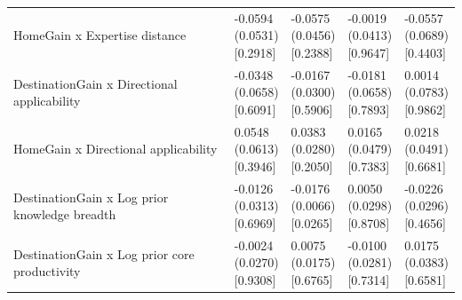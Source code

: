 \begin{tabular}{@{}>{\raggedright\arraybackslash}p{2.530in}>{\centering\arraybackslash}p{0.905in}>{\centering\arraybackslash}p{0.905in}>{\centering\arraybackslash}p{0.905in}>{\centering\arraybackslash}p{0.905in}@{}}
HomeGain x Expertise distance & \makecell[c]{-0.0594\\{}(0.0531)\\{}[0.2918]} & \makecell[c]{-0.0575\\{}(0.0456)\\{}[0.2388]} & \makecell[c]{-0.0019\\{}(0.0413)\\{}[0.9647]} & \makecell[c]{-0.0557\\{}(0.0689)\\{}[0.4403]} \\
DestinationGain x Directional applicability & \makecell[c]{-0.0348\\{}(0.0658)\\{}[0.6091]} & \makecell[c]{-0.0167\\{}(0.0300)\\{}[0.5906]} & \makecell[c]{-0.0181\\{}(0.0658)\\{}[0.7893]} & \makecell[c]{0.0014\\{}(0.0783)\\{}[0.9862]} \\
HomeGain x Directional applicability & \makecell[c]{0.0548\\{}(0.0613)\\{}[0.3946]} & \makecell[c]{0.0383\\{}(0.0280)\\{}[0.2050]} & \makecell[c]{0.0165\\{}(0.0479)\\{}[0.7383]} & \makecell[c]{0.0218\\{}(0.0491)\\{}[0.6681]} \\
DestinationGain x Log prior knowledge breadth & \makecell[c]{-0.0126\\{}(0.0313)\\{}[0.6969]} & \makecell[c]{-0.0176\\{}(0.0066)\\{}[0.0265]} & \makecell[c]{0.0050\\{}(0.0298)\\{}[0.8708]} & \makecell[c]{-0.0226\\{}(0.0296)\\{}[0.4656]} \\
DestinationGain x Log prior core productivity & \makecell[c]{-0.0024\\{}(0.0270)\\{}[0.9308]} & \makecell[c]{0.0075\\{}(0.0175)\\{}[0.6765]} & \makecell[c]{-0.0100\\{}(0.0281)\\{}[0.7314]} & \makecell[c]{0.0175\\{}(0.0383)\\{}[0.6581]} \\

\end{tabular}
